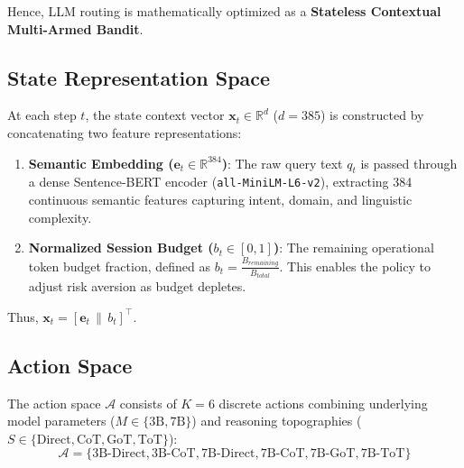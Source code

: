 \documentclass{article}
\begin{document}
Hence, LLM routing is mathematically optimized as a \textbf{Stateless Contextual Multi-Armed Bandit}.

\subsection{State Representation Space}
At each step $t$, the state context vector $\mathbf{x}_t \in \mathbb{R}^{d}$ ($d=385$) is constructed by concatenating two feature representations:
\begin{enumerate}
    \item \textbf{Semantic Embedding ($\mathbf{e}_t \in \mathbb{R}^{384}$)}: The raw query text $q_t$ is passed through a dense Sentence-BERT encoder (\texttt{all-MiniLM-L6-v2}), extracting 384 continuous semantic features capturing intent, domain, and linguistic complexity.
    \item \textbf{Normalized Session Budget ($b_t \in [0, 1]$)}: The remaining operational token budget fraction, defined as $b_t = \frac{B_{remaining}}{B_{total}}$. This enables the policy to adjust risk aversion as budget depletes.
\end{enumerate}

Thus, $\mathbf{x}_t = [\mathbf{e}_t \,\|\, b_t]^\top$.

\subsection{Action Space}
The action space $\mathcal{A}$ consists of $K=6$ discrete actions combining underlying model parameters ($M \in \{3\text{B}, 7\text{B}\}$) and reasoning topographies ($S \in \{\text{Direct}, \text{CoT}, \text{GoT}, \text{ToT}\}$):
\begin{equation}
    \mathcal{A} = \{ \text{3B-Direct}, \text{3B-CoT}, \text{7B-Direct}, \text{7B-CoT}, \text{7B-GoT}, \text{7B-ToT} \}
\end{equation}
\end{document}
